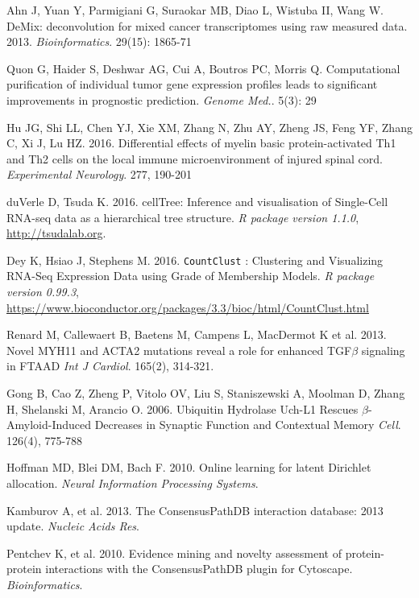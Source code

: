 \documentclass[10pt,letterpaper]{article}
\begin{document}
\begin{thebibliography}{9}
Ahn J, Yuan Y, Parmigiani G, Suraokar MB, Diao L, Wistuba II, Wang W.
DeMix: deconvolution for mixed cancer transcriptomes using raw measured data. 2013.
\textit{Bioinformatics}. 29(15): 1865-71

Quon G, Haider S, Deshwar AG, Cui A, Boutros PC, Morris Q.
Computational purification of individual tumor gene expression profiles leads to significant improvements in prognostic prediction.
\textit{Genome Med.}. 5(3): 29


 Hu JG,  Shi LL,  Chen YJ,  Xie XM,  Zhang N,  Zhu AY,  Zheng JS,  Feng YF,  Zhang C,  Xi J,  Lu HZ. 2016.
 Differential effects of myelin basic protein-activated Th1 and Th2 cells on the local immune microenvironment of injured spinal cord.
 \textit{Experimental Neurology}. 277, 190-201

 duVerle D, Tsuda K. 2016.
 cellTree: Inference and visualisation of Single-Cell RNA-seq data as a hierarchical tree structure.
 \textit{R package version 1.1.0}, \url{http://tsudalab.org}.

 Dey K, Hsiao J, Stephens M. 2016.
{\tt CountClust} : Clustering and Visualizing RNA-Seq Expression Data using Grade of Membership Models.
 \textit{R package version 0.99.3}, \url{https://www.bioconductor.org/packages/3.3/bioc/html/CountClust.html}


 Renard M,  Callewaert B,  Baetens M,  Campens L,  MacDermot K et al. 2013.
 Novel MYH11 and ACTA2 mutations reveal a role for enhanced TGF$\beta$ signaling in FTAAD
 \textit{Int J Cardiol}. 165(2), 314-321.

 Gong B,  Cao Z,  Zheng P,  Vitolo OV,  Liu S,  Staniszewski A,  Moolman D,  Zhang H,  Shelanski M,  Arancio O. 2006.
 Ubiquitin Hydrolase Uch-L1 Rescues $\beta$-Amyloid-Induced Decreases in Synaptic Function and Contextual Memory
 \textit{Cell}. 126(4), 775-788

 Hoffman MD,  Blei DM,  Bach F. 2010.
 Online learning for latent Dirichlet allocation.
 \textit{Neural Information Processing Systems}.

 Kamburov A,  et al. 2013.
 The ConsensusPathDB interaction database: 2013 update.
 \textit{Nucleic Acids Res}.

 Pentchev K,  et al. 2010.
 Evidence mining and novelty assessment of protein-protein interactions with the ConsensusPathDB plugin for Cytoscape.
 \textit{Bioinformatics}.


\end{thebibliography}
\end{document}
